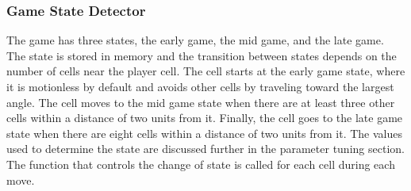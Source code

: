 \subsubsection{Game State Detector}
The game has three states, the early game, the mid game, and the late game. The state is stored in memory and the transition between states depends on the number of cells near the player cell. The cell starts at the early game state, where it is motionless by default and avoids other cells by traveling toward the largest angle. The cell moves to the mid game state when there are at least three other cells within a distance of two units from it. Finally, the cell goes to the late game state when there are eight cells within a distance of two units from it. The values used to determine the state are discussed further in the parameter tuning section. The function that controls the change of state is called for each cell during each move.\\

